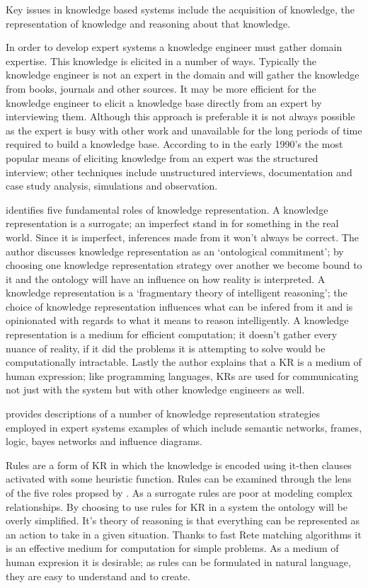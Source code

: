 Key issues in knowledge based systems include the acquisition of knowledge, the representation of knowledge and reasoning about that knowledge.

In order to develop expert systems a knowledge engineer must gather domain expertise. This knowledge is elicited in a number of ways. Typically the knowledge engineer is not an expert in the domain and will gather the knowledge from books, journals and other sources. It may be more efficient for the knowledge engineer to elicit a knowledge base directly from an expert by interviewing them. Although this approach is preferable it is not always possible as the expert is busy with other work and unavailable for the long periods of time required to build a knowledge base. According to \cite{sagheb2009conceptual} in the early 1990's the most popular means of eliciting knowledge from an expert was the structured interview; other techniques include unstructured interviews, documentation and case study analysis, simulations and observation. 

\cite{davis1993knowledge} identifies five fundamental roles of knowledge representation. A knowledge representation is a surrogate; an imperfect stand in for something in the real world. Since it is imperfect, inferences made from it won't always be correct. The author discusses knowledge representation as an `ontological commitment'; by choosing one knowledge representation strategy over another we become bound to it and the ontology will have an influence on how reality is interpreted. A knowledge representation is a `fragmentary theory of intelligent reasoning'; the choice of knowledge representation influences what can be infered from it and is opinionated with regards to what it means to reason intelligently. A knowledge representation is a medium for efficient computation; it doesn't gather every nuance of reality, if it did the problems it is attempting to solve would be computationally intractable. Lastly the author explains that a KR is a medium of human expression; like programming languages, KRs are used for communicating not just with the system but with other knowledge engineers as well.

\cite{petrik2004knowledge} provides descriptions of a number of knowledge representation strategies employed in expert systems examples of which include semantic networks, frames, logic, bayes networks and influence diagrams. 

Rules are a form of KR in which the knowledge is encoded using it-then clauses activated with some heuristic function. Rules can be examined through the lens of the five roles propsed by \cite{davis1993knowledge}. As a surrogate rules are poor at modeling complex relationships. By choosing to use rules for KR in a system the ontology will be overly simplified. It's theory of reasoning is that everything can be represented as an action to take in a given situation. Thanks to fast Rete matching algorithms it is an effective medium for computation for simple problems. As a medium of human expresion it is desirable; as rules can be formulated in natural language, they are easy to understand and to create.

